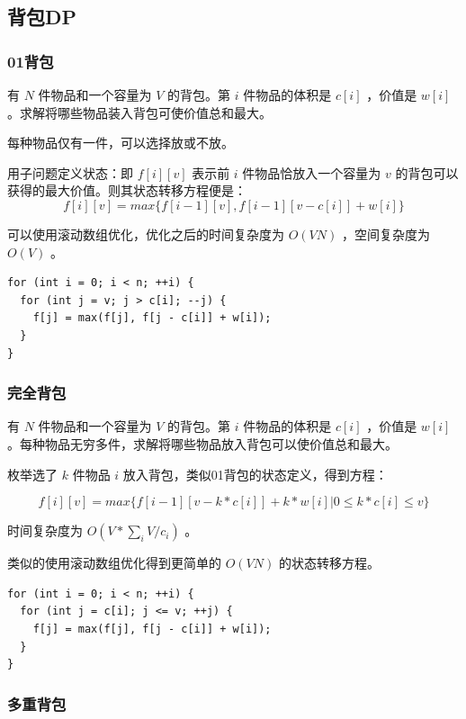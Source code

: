 \documentclass[11pt]{article}
\begin{document}
\subsection{背包DP}
\label{sec-2-2}
\subsubsection{01背包}
\label{sec-2-2-1}

有 $N$ 件物品和一个容量为 $V$ 的背包。第 $i$ 件物品的体积是 $c[i]$ ，价值是 $w[i]$ 。求解将哪些物品装入背包可使价值总和最大。

每种物品仅有一件，可以选择放或不放。

用子问题定义状态：即 $f[i][v]$ 表示前 $i$ 件物品恰放入一个容量为 $v$ 的背包可以获得的最大价值。则其状态转移方程便是：
$$
f[i][v]=max\{f[i-1][v],f[i-1][v-c[i]]+w[i]\}
$$

可以使用滚动数组优化，优化之后的时间复杂度为 $O(VN)$ ，空间复杂度为 $O(V)$ 。

\begin{verbatim}
for (int i = 0; i < n; ++i) {
  for (int j = v; j > c[i]; --j) {
    f[j] = max(f[j], f[j - c[i]] + w[i]);
  }
}
\end{verbatim}

\subsubsection{完全背包}
\label{sec-2-2-2}

有 $N$ 件物品和一个容量为 $V$ 的背包。第 $i$ 件物品的体积是 $c[i]$ ，价值是 $w[i]$ 。每种物品无穷多件，求解将哪些物品放入背包可以使价值总和最大。

枚举选了 $k$ 件物品 $i$ 放入背包，类似01背包的状态定义，得到方程：

$$
f[i][v]=max\{f[i-1][v-k*c[i]]+k*w[i]|0 \leq k*c[i] \leq v\}
$$

时间复杂度为 $O(V*\sum_i V/c_i)$ 。

类似的使用滚动数组优化得到更简单的 $O(VN)$ 的状态转移方程。

\begin{verbatim}
for (int i = 0; i < n; ++i) {
  for (int j = c[i]; j <= v; ++j) {
    f[j] = max(f[j], f[j - c[i]] + w[i]);
  }
}
\end{verbatim}

\subsubsection{多重背包}
\label{sec-2-2-3}
\end{document}
